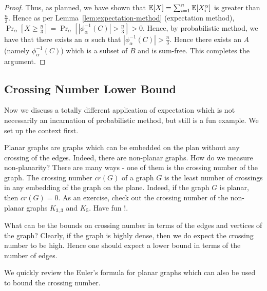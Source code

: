 \begin{proof}
Thus, as planned, we have shown that ${\mathbb E}[X] = \sum_{i=1}^n {\mathbb E}[X_i^{\alpha}]$ is greater than $\frac{n}{3}$. Hence as per Lemma~\ref{lem:expectation-method} (expectation method), $\Pr_{\alpha}[X \ge \frac{n}{3}] = \Pr_{\alpha}\left[|\phi_\alpha^{-1}(C)| > \frac{n}{3}\right] > 0$. Hence, by probabilistic method, we have that there exists an $\alpha$ such that $|\phi_\alpha^{-1}(C)| > \frac{n}{3}$. Hence there exists an $A$ (namely $\phi_\alpha^{-1}(C)$) which is a subset of $B$ and is sum-free. This completes the argument.
\end{proof}

\subsection{Crossing Number Lower Bound}

Now we discuss a totally different application of expectation which is not necessarily an incarnation of probabilistic method, but still is a fun example.
We set up the context first.

Planar graphs are graphs which can be embedded on the plan without any crossing of the edges. Indeed, there are non-planar graphs. How do we measure non-planarity? There are many ways - one of them is the crossing number of the graph. The crossing number $cr(G)$ of a graph $G$ is the least number of crossings in any embedding of the graph on the plane. Indeed, if the graph $G$ is planar, then $cr(G)=0$. As an exercise, check out the crossing number of the non-planar graphs $K_{3,3}$ and $K_5$. Have fun !.

What can be the bounds on crossing number in terms of the edges and vertices of the graph? Clearly, if the graph is highly dense, then we do expect the crossing number to be high. Hence one should expect a lower bound in terms of the number of edges.

We quickly review the Euler's formula for planar graphs which can also be used to bound the crossing number.

